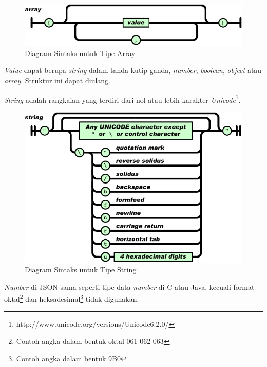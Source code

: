 \documentclass[a4paper, 12pt, oneside]{report}
\begin{document}
\begin{figure}[htp]
\centering
\includegraphics[scale=0.55]{images/array-json.png}
\caption{Diagram Sintaks untuk Tipe Array \cite{json-fat-free}}
\label{Diagram Sintaks untuk Tipe Array}
\end{figure}

\onehalfspacing \textit{Value} dapat berupa \textit{string} dalam tanda kutip ganda, \textit{number}, \textit{boolean}, \textit{object} atau \textit{array}. Struktur ini dapat diulang.

\onehalfspacing \textit{String} adalah rangkaian yang terdiri dari nol atau lebih karakter \textit{Unicode}\footnote{http://www.unicode.org/versions/Unicode6.2.0/}.

\begin{figure}[htp]
\centering
\includegraphics[scale=0.55]{images/string-json.png}
\caption{Diagram Sintaks untuk Tipe String \cite{json-fat-free}}
\label{Diagram Sintaks untuk Tipe String}
\end{figure}

\onehalfspacing \textit{Number} di JSON sama seperti tipe data \textit{number} di C atau Java, kecuali format oktal\footnote{Contoh angka dalam bentuk oktal 061 062 063} dan heksadesimal\footnote{Contoh angka dalam bentuk 9B0} tidak digunakan.
\end{document}
